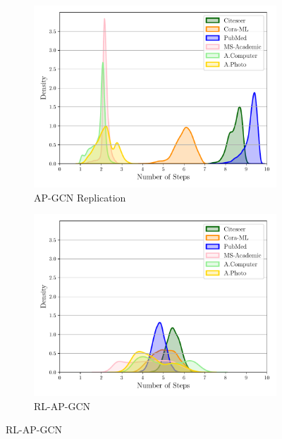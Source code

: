 \documentclass{gdl}
\begin{document}
\begin{figure}[p]
    \centering
    \begin{minipage}[t]{0.48\textwidth}
        \centering
        \begin{subfigure}[b]{0.8\textwidth}
            \centering
            \includegraphics[width=\textwidth]{Spinelli_steps_distribution.pdf}
            \captionsetup{justification=centerlast}
            \caption{AP-GCN Replication}
            \label{fig:step_dist_AP_GCN}
        \end{subfigure}
        
        \begin{subfigure}[b]{0.8\textwidth}
            \centering
            \includegraphics[width=\textwidth]{RL-AP-GCN_steps_distribution.pdf}
            \captionsetup{justification=centerlast}
            \caption{RL-AP-GCN}
            \label{fig:step_dist_RL_AP_GCN}
        \end{subfigure}
        

\end{minipage}
\end{figure}
\end{document}
